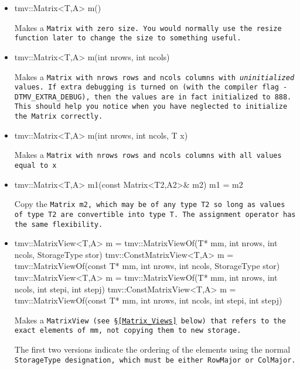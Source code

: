 \begin{itemize}

\item
\begin{tmvcode}
tmv::Matrix<T,A> m()
\end{tmvcode}
Makes a \tt{Matrix} with zero size.  You would normally use the \tt{resize} function later to
change the size to something useful.

\item 
\begin{tmvcode}
tmv::Matrix<T,A> m(int nrows, int ncols)
\end{tmvcode}
Makes a \tt{Matrix} with \tt{nrows} rows and \tt{ncols} columns with 
{\em uninitialized} values.
If extra debugging is turned on (with the compiler flag \tt{-DTMV\_EXTRA\_DEBUG}), then the values are in fact initialized to 888.  This should help you notice when you have neglected to initialize the \tt{Matrix} correctly.

\item
\begin{tmvcode}
tmv::Matrix<T,A> m(int nrows, int ncols, T x)
\end{tmvcode}
Makes a \tt{Matrix} with \tt{nrows} rows and \tt{ncols} columns with all 
values equal to \tt{x}

\item
\begin{tmvcode}
tmv::Matrix<T,A> m1(const Matrix<T2,A2>& m2)
m1 = m2
\end{tmvcode}
Copy the \tt{Matrix m2}, which may be of any type \tt{T2} so long
as values of type \tt{T2} are convertible into type \tt{T}.
The assignment operator has the same flexibility.

\item
\begin{tmvcode}
tmv::MatrixView<T,A> m = 
      tmv::MatrixViewOf(T* mm, int nrows, int ncols, 
      StorageType stor)
tmv::ConstMatrixView<T,A> m = 
      tmv::MatrixViewOf(const T* mm, int nrows, int ncols, 
      StorageType stor)
tmv::MatrixView<T,A> m = 
      tmv::MatrixViewOf(T* mm, int nrows, int ncols, 
      int stepi, int stepj)
tmv::ConstMatrixView<T,A> m = 
      tmv::MatrixViewOf(const T* mm, int nrows, int ncols, 
      int stepi, int stepj)
\end{tmvcode}
Makes a \tt{MatrixView} (see \S\ref{Matrix_Views} below) that refers to the exact
elements of \tt{mm}, not copying them to new storage. 

The first two versions
indicate the ordering of the elements using the normal \tt{StorageType}
designation, which must be either \tt{RowMajor} or \tt{ColMajor}.
  

\end{itemize}
